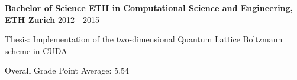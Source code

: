 
\textbf{Bachelor of Science ETH in Computational Science and Engineering, ETH Zurich} \hfill 2012 - 2015

Thesis: Implementation of the two-dimensional Quantum Lattice Boltzmann scheme in CUDA

Overall Grade Point Average: 5.54
